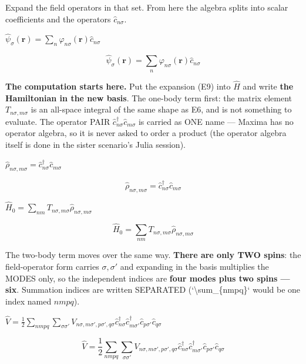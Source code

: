 \documentclass[dvipdfmx]{article}
\begin{document}
Expand the field operators in that set. From here the algebra splits into scalar coefficients and the operators $\hat c_{n\sigma}$.

$\hat\psi_\sigma(\mathbf{r}) = \sum_n \varphi_{n\sigma}(\mathbf{r}) \hat c_{n\sigma}$

\begin{equation}
  \hat\psi_\sigma(\mathbf{r}) = \sum_n \varphi_{n\sigma}(\mathbf{r}) \hat c_{n\sigma}
  \label{eq:E9}
\end{equation}

\textbf{The computation starts here.} Put the expansion (E9) into $\hat H$ and write \textbf{the Hamiltonian in the new basis}. The one-body term first: the matrix element $T_{n\sigma,m\sigma}$ is an all-space integral of the same shape as E6, and is not something to evaluate. The operator PAIR $\hat c^\dagger_{n\sigma}\hat c_{m\sigma}$ is carried as ONE name — Maxima has no operator algebra, so it is never asked to order a product (the operator algebra itself is done in the sister scenario's Julia session).

$\hat\rho_{n\sigma,m\sigma} = \hat c^\dagger_{n\sigma} \hat c_{m\sigma}$

\begin{equation}
  \hat\rho_{n\sigma,m\sigma} = \hat c^\dagger_{n\sigma} \hat c_{m\sigma}
  \label{eq:E10}
\end{equation}

$\hat H_0 = \sum_{n m} T_{n\sigma,m\sigma} \hat\rho_{n\sigma,m\sigma}$

\begin{equation}
  \hat H_0 = \sum_{n m} T_{n\sigma,m\sigma} \hat\rho_{n\sigma,m\sigma}
  \label{eq:E11}
\end{equation}

The two-body term moves over the same way. \textbf{There are only TWO spins}: the field-operator form carries $\sigma,\sigma'$ and expanding in the basis multiplies the MODES only, so the independent indices are \textbf{four modes plus two spins — six}. Summation indices are written SEPARATED (`\textbackslash{}sum\_\{nmpq\}` would be one index named $nmpq$).

$\hat V = \frac{1}{2}\sum_{n m p q}\sum_{\sigma \sigma'} V_{n\sigma,m\sigma',p\sigma',q\sigma} \hat c^\dagger_{n\sigma} \hat c^\dagger_{m\sigma'} \hat c_{p\sigma'} \hat c_{q\sigma}$

\begin{equation}
  \hat V = \frac{1}{2}\sum_{n m p q}\sum_{\sigma \sigma'} V_{n\sigma,m\sigma',p\sigma',q\sigma} \hat c^\dagger_{n\sigma} \hat c^\dagger_{m\sigma'} \hat c_{p\sigma'} \hat c_{q\sigma}
  \label{eq:E12}
\end{equation}
\end{document}
